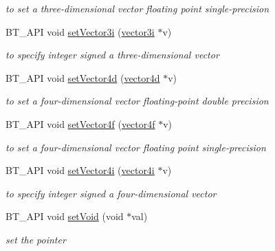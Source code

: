 \begin{DoxyCompactItemize}
\begin{DoxyCompactList}\small\item\em to set a three-\/dimensional vector floating point single-\/precision \end{DoxyCompactList}\item 
\hypertarget{classbt_1_1_variant_a6562ad4b258a9be7a2fe1d0ce9f04032}{B\-T\-\_\-\-A\-P\-I void \hyperlink{classbt_1_1_variant_a6562ad4b258a9be7a2fe1d0ce9f04032}{set\-Vector3i} (\hyperlink{classbt_1_1vector3i}{vector3i} $\ast$v)}\label{classbt_1_1_variant_a6562ad4b258a9be7a2fe1d0ce9f04032}

\begin{DoxyCompactList}\small\item\em to specify integer signed a three-\/dimensional vector \end{DoxyCompactList}\item 
\hypertarget{classbt_1_1_variant_a3dd4e399cd558389db48e04b8ace02df}{B\-T\-\_\-\-A\-P\-I void \hyperlink{classbt_1_1_variant_a3dd4e399cd558389db48e04b8ace02df}{set\-Vector4d} (\hyperlink{classbt_1_1vector4d}{vector4d} $\ast$v)}\label{classbt_1_1_variant_a3dd4e399cd558389db48e04b8ace02df}

\begin{DoxyCompactList}\small\item\em to set a four-\/dimensional vector floating-\/point double precision \end{DoxyCompactList}\item 
\hypertarget{classbt_1_1_variant_a3a795b0c65a558cb918cb85f1cded6a7}{B\-T\-\_\-\-A\-P\-I void \hyperlink{classbt_1_1_variant_a3a795b0c65a558cb918cb85f1cded6a7}{set\-Vector4f} (\hyperlink{classbt_1_1vector4f}{vector4f} $\ast$v)}\label{classbt_1_1_variant_a3a795b0c65a558cb918cb85f1cded6a7}

\begin{DoxyCompactList}\small\item\em to set a four-\/dimensional vector floating point single-\/precision \end{DoxyCompactList}\item 
\hypertarget{classbt_1_1_variant_a1d401e90e86f786b021c512eb388badc}{B\-T\-\_\-\-A\-P\-I void \hyperlink{classbt_1_1_variant_a1d401e90e86f786b021c512eb388badc}{set\-Vector4i} (\hyperlink{classbt_1_1vector4i}{vector4i} $\ast$v)}\label{classbt_1_1_variant_a1d401e90e86f786b021c512eb388badc}

\begin{DoxyCompactList}\small\item\em to specify integer signed a four-\/dimensional vector \end{DoxyCompactList}\item 
\hypertarget{classbt_1_1_variant_a343c80b4ae919f68c911386c2e990ab8}{B\-T\-\_\-\-A\-P\-I void \hyperlink{classbt_1_1_variant_a343c80b4ae919f68c911386c2e990ab8}{set\-Void} (void $\ast$val)}\label{classbt_1_1_variant_a343c80b4ae919f68c911386c2e990ab8}

\begin{DoxyCompactList}\small\item\em set the pointer \end{DoxyCompactList}\end{DoxyCompactItemize}



